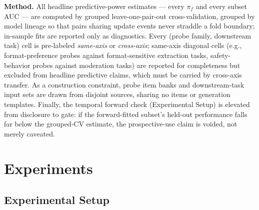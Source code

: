 \documentclass[11pt]{article}
\begin{document}
\textbf{Method.} All headline predictive-power estimates --- every $\pi_f$ and every subset AUC --- are computed by grouped leave-one-pair-out cross-validation, grouped by model lineage so that pairs sharing update events never straddle a fold boundary; in-sample fits are reported only as diagnostics. Every (probe family, downstream task) cell is pre-labeled \emph{same-axis} or \emph{cross-axis}; same-axis diagonal cells (e.g., format-preference probes against format-sensitive extraction tasks, safety-behavior probes against moderation tasks) are reported for completeness but excluded from headline predictive claims, which must be carried by cross-axis transfer. As a construction constraint, probe item banks and downstream-task input sets are drawn from disjoint sources, sharing no items or generation templates. Finally, the temporal forward check (Experimental Setup) is elevated from disclosure to gate: if the forward-fitted subset's held-out performance falls far below the grouped-CV estimate, the prospective-use claim is voided, not merely caveated.

\section{Experiments}

\subsection{Experimental Setup}
\end{document}
